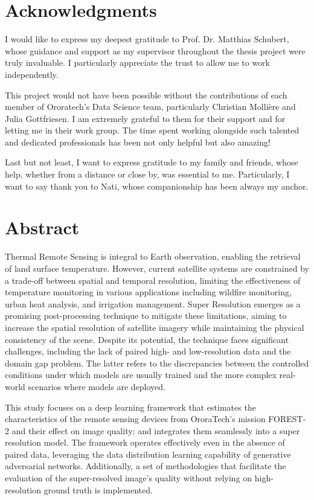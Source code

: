 \section*{Acknowledgments}

 \thispagestyle{empty}
I would like to express my deepest gratitude to Prof. Dr. Matthias Schubert, whose guidance and support as my supervisor throughout the thesis project were truly invaluable. I particularly appreciate the trust to allow me to work independently.


This project would not have been possible without the contributions of each member of Ororatech’s Data Science team, particularly Christian Mollière and Julia Gottfriesen. I am extremely grateful to them for their support and for letting me in their work group. The time spent working alongside such talented and dedicated professionals has been not only helpful but also amazing!


Last but not least, I want to express gratitude to my family and friends, whose help, whether from a distance or close by, was essential to me. Particularly, I want to say thank you to Nati, whose companionship has been always my anchor.



\pagebreak

\section*{Abstract}
 \thispagestyle{empty}
Thermal Remote Sensing is integral to Earth observation, enabling the retrieval of land surface temperature. However, current satellite systems are constrained by a trade-off between spatial and temporal resolution, limiting the effectiveness of temperature monitoring in various applications including wildfire monitoring, urban heat analysis, and irrigation management.
Super Resolution emerges as a promising post-processing technique to mitigate these limitations, aiming to increase the spatial resolution of satellite imagery while maintaining the physical consistency of the scene. Despite its potential, the technique faces significant challenges, including the lack of paired high- and low-resolution data and the domain gap problem. The latter refers to the discrepancies between the controlled conditions under which models are usually trained and the more complex real-world scenarios where models are deployed. 

This study focuses on a deep learning framework that estimates the characteristics of the remote sensing devices from OroraTech's mission FOREST-2 and their effect on image quality; and integrates them seamlessly into a super resolution model. The framework operates effectively even in the absence of paired data, leveraging the data distribution learning capability of generative adversarial networks. Additionally, a set of methodologies that facilitate the evaluation of the super-resolved image's quality without relying on high-resolution ground truth is implemented.

